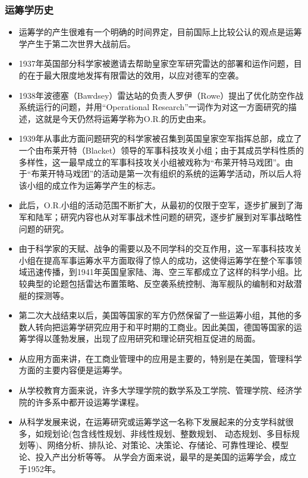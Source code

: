 \subsubsection{运筹学历史}
\begin{frame}[allowframebreaks]{\subsecname}
\begin{itemize}
    \item 运筹学的产生很难有一个明确的时间界定，目前国际上比较公认的观点是运筹学产生于第二次世界大战前后。
    \item 1937年英国部分科学家被邀请去帮助皇家空军研究雷达的部署和运作问题，目的在于最大限度地发挥有限雷达的效用，以应对德军的空袭。
    \item 1938年波德塞（Bawdsey）雷达站的负责人罗伊（Rowe）提出了优化防空作战系统运行的问题，并用“Operational Research”一词作为对这一方面研究的描述，这就是今天仍然将运筹学称为O.R.的历史由来。
    \item 1939年从事此方面问题研究的科学家被召集到英国皇家空军指挥总部，成立了一个由布莱开特（Blacket）领导的军事科技攻关小组；由于其成员学科性质的多样性，这一最早成立的军事科技攻关小组被戏称为“布莱开特马戏团”。由于“布莱开特马戏团”的活动是第一次有组织的系统的运筹学活动，所以后人将该小组的成立作为运筹学产生的标志。
    \item 此后，O.R.小组的活动范围不断扩大，从最初的仅限于空军，逐步扩展到了海军和陆军；研究内容也从对军事战术性问题的研究，逐步扩展到对军事战略性问题的研究。
    \item 由于科学家的天赋、战争的需要以及不同学科的交互作用，这一军事科技攻关小组在提高军事运筹水平方面取得了惊人的成功，这使得运筹学在整个军事领域迅速传播，到1941年英国皇家陆、海、空三军都成立了这样的科学小组。比较典型的论题包括雷达布置策略、反空袭系统控制、海军舰队的编制和对敌潜艇的探测等。
    \item 第二次大战结束以后，美国等国家的军方仍然保留了一些运筹小组，其他的多数人转向把运筹学研究应用于和平时期的工商业。因此美国，德国等国家的运筹学得以蓬勃发展，出现了应用研究和理论研究相互促进的局面。
    \item 从应用方面来讲，在工商业管理中的应用是主要的，特别是在美国，管理科学方面的主要内容便是运筹学。
    \item 从学校教育方面来说，许多大学理学院的数学系及工学院、管理学院、经济学院的许多系中都开设运筹学课程。
    \item 从科学发展来说，在运筹研究或运筹学这一名称下发展起来的分支学科就很多，如规划论(包含线性规划、非线性规划、整数规划、 动态规划、多目标规划等)、网络分析、排队论、对策论、决策论、存储论、可靠性理论、模型论、投入产出分析等等。
从学会方面来说，最早的是美国的运筹学会，成立于1952年。
\end{itemize}
\end{frame}

